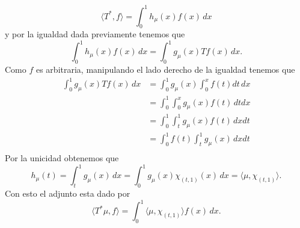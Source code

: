 \begin{itemize}
\begin{sproof}
    $$\langle T^*,f\rangle=\int_0^1h_\mu(x) f(x)\,dx$$
    y por la igualdad dada previamente tenemos que
    $$\int_0^1h_\mu(x) f(x)\,dx=\int_0^1g_\mu(x)Tf(x)\,dx.$$
    Como $f$ es arbitraria, manipulando el lado derecho de la igualdad tenemos que
    \begin{align*}
        \int_0^1g_\mu(x)Tf(x)\,dx&=\int_0^1g_\mu(x)\int_0^xf(t)dt\,dx\\
        &=\int_0^1\int_0^xg_\mu(x)f(t)\,dtdx\\
        &=\int_0^1\int_t^1g_\mu(x)f(t)\,dxdt\\
        &=\int_0^1f(t)\int_t^1g_\mu(x)\,dxdt\\
    \end{align*}
    Por la unicidad obtenemos que
    $$h_\mu(t)=\int_t^1g_\mu(x)\,dx=\int_0^1g_\mu(x)\chi_{(t,1)}(x)\,dx=\langle\mu,\chi_{(t,1)}\rangle.$$
    Con esto el adjunto esta dado por
    $$\langle T^*\mu,f\rangle=\int_0^1\langle\mu,\chi_{(t,1)}\rangle f(x)\,dx.$$

    \end{sproof}
\end{itemize}
